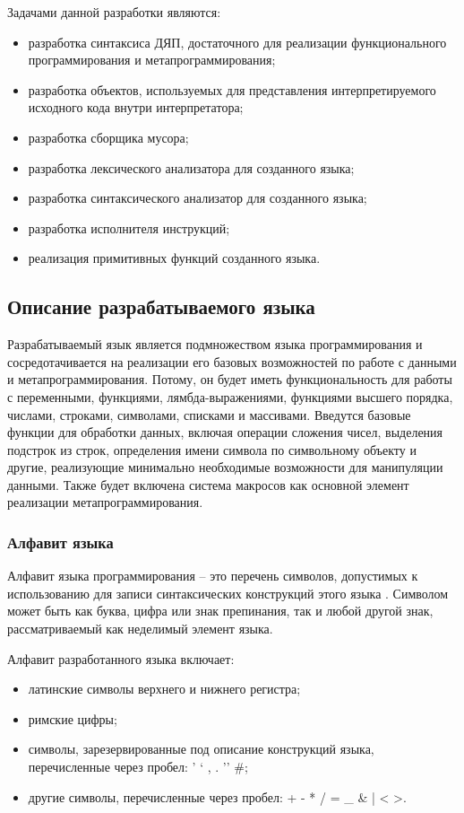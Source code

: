 Задачами данной разработки являются:
\begin{itemize}
\item разработка синтаксиса ДЯП, достаточного для реализации функционального программирования и метапрограммирования;
\item разработка объектов, используемых для представления интерпретируемого исходного кода внутри интерпретатора;
\item разработка сборщика мусора;
\item разработка лексического анализатора для созданного языка;
\item разработка синтаксического анализатор для созданного языка;
\item разработка исполнителя инструкций;
\item реализация примитивных функций созданного языка.
\end{itemize}


\subsection{Описание разрабатываемого языка}

Разрабатываемый язык является подмножеством языка программирования  и сосредотачивается на реализации его базовых возможностей по работе с данными и метапрограммирования. Потому, он будет иметь функциональность для работы с переменными, функциями, лямбда-выражениями, функциями высшего порядка, числами, строками, символами, списками и массивами. Введутся базовые функции для обработки данных, включая операции сложения чисел, выделения подстрок из строк, определения имени символа по символьному объекту и другие, реализующие минимально необходимые возможности для манипуляции данными. Также будет включена система макросов как основной элемент реализации метапрограммирования.

\subsubsection{Алфавит языка}
Алфавит языка программирования -- это перечень символов, допустимых к использованию для записи синтаксических конструкций этого языка \cite{e4}. Символом может быть как буква, цифра или знак препинания, так и любой другой знак, рассматриваемый как неделимый элемент языка.

Алфавит разработанного языка включает:
\begin{itemize}
	\item латинские символы верхнего и нижнего регистра;
	\item римские цифры;
	\item символы, зарезервированные под описание конструкций языка, перечисленные через пробел: ' ` , . '' \#;
	\item другие символы, перечисленные через пробел: + - * / = \_ \& | < >.
\end{itemize}

